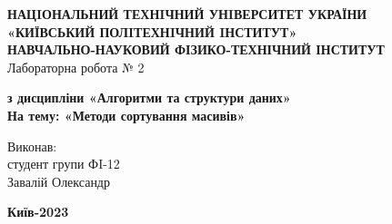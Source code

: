 \documentclass[a4paper,12pt]{article}
\begin{document}
    \begin{center}
        \hfill \break
        \large{\textbf{НАЦIОНАЛЬНИЙ ТЕХНIЧНИЙ УНIВЕРСИТЕТ УКРАЇНИ\\
                «КИЇВСЬКИЙ ПОЛIТЕХНIЧНИЙ IНСТИТУТ»\\
                НАВЧАЛЬНО-НАУКОВИЙ ФІЗИКО-ТЕХНІЧНИЙ ІНСТИТУТ}}\\
        \hfill \break \hfill \break \hfill\break \hfill \break \hfill \break \hfill \break \hfill \break
        \hfill \break \hfill \break \hfill \break \hfill \break
        \large{Лабораторна робота № 2}
        \begin{center}
            \normalsize{\textbf{з дисципліни «Алгоритми та структури даних» \\
            На тему: «Методи сортування масивів» \\}}
        \end{center}
    \end{center}
    \hfill \break \hfill \break \hfill \break \hfill \break \hfill \break \hfill \break \hfill \break
    \hfill \break \hfill \break \hfill \break \hfill \break \hfill \break \hfill \break 
    \begin{flushright}
        \large{ \hspace{35pt} Виконав:\\
            студент групи ФI-12\\
            Завалій Олександр} 
    \end{flushright}
    \hfill \break \hfill \break \hfill \break \hfill \break \hfill \break \hfill \break \hfill \break
    \hfill \break
    \begin{center} \textbf{Київ-2023} \end{center}
    \thispagestyle{empty}
\end{document}
